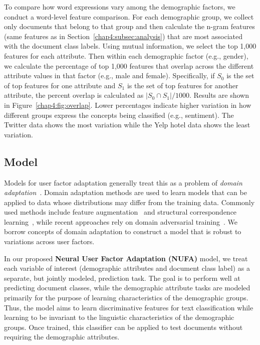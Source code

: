To compare how word expressions vary among the demographic factors, we conduct a word-level feature comparison.
For each demographic group, we collect only documents that belong to that group and then calculate the n-gram features (same features as in Section~\ref{chap4:subsec:analysis}) that are most associated with the document class labels.
Using mutual information, we select the top 1,000 features for each attribute.
Then within each demographic factor (e.g., gender),
we calculate the percentage of top 1,000 features that overlap across the different attribute values in that factor (e.g., male and female).
Specifically, if $S_0$ is the set of top features for one attribute and $S_1$ is the set of top features for another attribute, the percent overlap is calculated as $|S_0 \cap S_1|/1000$.
Results are shown in Figure~\ref{chap4:fig:overlap}. 
Lower percentages indicate higher variation in how different groups express the concepts being classified (e.g., sentiment).
The Twitter data shows the most variation while the Yelp hotel data shows the least variation.


\subsection{Model}
\label{chap4:subsec:model}



Models for user factor adaptation generally treat
this as a problem of {\em domain adaptation}~\cite{volkova2013exploring,lynn2017human}.
Domain adaptation methods are used to learn models that can be applied to data whose distributions may differ from the training data.
Commonly used methods include feature augmentation~\cite{daume2007frustratingly, joshi2013s, huang2018examining}
and structural correspondence learning~\cite{blitzer2006domain},
while recent approaches rely on 
domain adversarial training~\cite{ganin2016domain, chen2016adversarial, liu2017adversarial, huang2018modeling}. 
We borrow concepts of domain adaptation to construct a model that is robust to variations across user factors.


In our proposed {\bf Neural User Factor Adaptation (NUFA)} model, we treat each variable of interest (demographic attributes and document class label) as a separate, but jointly modeled, prediction task.
The goal is to perform well at predicting document classes, while the demographic attribute tasks are modeled primarily for the purpose of learning characteristics of the demographic groups.
Thus, the model aims to learn discriminative features for text classification while learning to be invariant to the linguistic characteristics of the demographic groups. 
Once trained, this classifier can be applied to test documents without requiring the demographic attributes.

